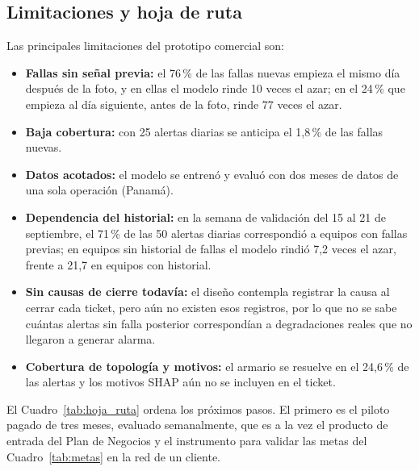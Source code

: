 \documentclass[12pt,a4paper]{article}
\begin{document}
\subsection{Limitaciones y hoja de ruta}
\label{subsec:hoja_ruta}
\noindent
Las principales limitaciones del prototipo comercial son:
\begin{itemize}
    \item \textbf{Fallas sin señal previa:} el 76\,\% de las fallas nuevas empieza el mismo día después de la foto, y en ellas el modelo rinde 10 veces el azar; en el 24\,\% que empieza al día siguiente, antes de la foto, rinde 77 veces el azar.
    \item \textbf{Baja cobertura:} con 25 alertas diarias se anticipa el 1,8\,\% de las fallas nuevas.
    \item \textbf{Datos acotados:} el modelo se entrenó y evaluó con dos meses de datos de una sola operación (Panamá).
    \item \textbf{Dependencia del historial:} en la semana de validación del 15 al 21 de septiembre, el 71\,\% de las 50 alertas diarias correspondió a equipos con fallas previas; en equipos sin historial de fallas el modelo rindió 7,2 veces el azar, frente a 21,7 en equipos con historial.
    \item \textbf{Sin causas de cierre todavía:} el diseño contempla registrar la causa al cerrar cada ticket, pero aún no existen esos registros, por lo que no se sabe cuántas alertas sin falla posterior correspondían a degradaciones reales que no llegaron a generar alarma.
    \item \textbf{Cobertura de topología y motivos:} el armario se resuelve en el 24,6\,\% de las alertas y los motivos SHAP aún no se incluyen en el ticket.
\end{itemize}

\noindent
El Cuadro~\ref{tab:hoja_ruta} ordena los próximos pasos. El primero es el piloto pagado de tres meses, evaluado semanalmente, que es a la vez el producto de entrada del Plan de Negocios y el instrumento para validar las metas del Cuadro~\ref{tab:metas} en la red de un cliente.
\end{document}
